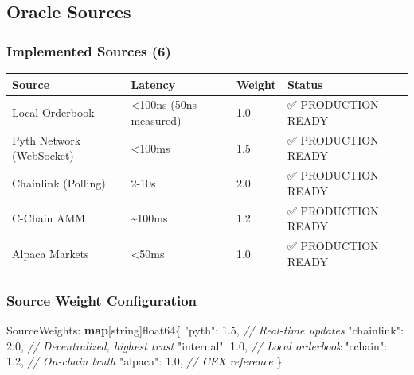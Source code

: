 \documentclass[
]{article}
\newenvironment{Shaded}{}{}
\newcommand{\CommentTok}[1]{\textcolor[rgb]{0.38,0.63,0.69}{\textit{#1}}}
\newcommand{\DataTypeTok}[1]{\textcolor[rgb]{0.56,0.13,0.00}{#1}}
\newcommand{\FloatTok}[1]{\textcolor[rgb]{0.25,0.63,0.44}{#1}}
\newcommand{\KeywordTok}[1]{\textcolor[rgb]{0.00,0.44,0.13}{\textbf{#1}}}
\newcommand{\NormalTok}[1]{#1}
\newcommand{\OperatorTok}[1]{\textcolor[rgb]{0.40,0.40,0.40}{#1}}
\newcommand{\StringTok}[1]{\textcolor[rgb]{0.25,0.44,0.63}{#1}}
\newcounter{none} %
\begin{document}
\subsection{Oracle Sources}\label{oracle-sources}

\subsubsection{Implemented Sources (6)}\label{implemented-sources-6}

{\def\LTcaptype{none} %
\begin{longtable}[]{@{}llll@{}}
\toprule\noalign{}
Source & Latency & Weight & Status \\
\midrule\noalign{}
\endhead
\bottomrule\noalign{}
\endlastfoot
Local Orderbook & \textless100ns (50ns measured) & 1.0 & ✅ PRODUCTION
READY \\
Pyth Network (WebSocket) & \textless100ms & 1.5 & ✅ PRODUCTION READY \\
Chainlink (Polling) & 2-10s & 2.0 & ✅ PRODUCTION READY \\
C-Chain AMM & \textasciitilde100ms & 1.2 & ✅ PRODUCTION READY \\
Alpaca Markets & \textless50ms & 1.0 & ✅ PRODUCTION READY \\
\end{longtable}
}

\subsubsection{Source Weight
Configuration}\label{source-weight-configuration}

\begin{Shaded}
\begin{Highlighting}[]
\NormalTok{SourceWeights}\OperatorTok{:} \KeywordTok{map}\OperatorTok{[}\DataTypeTok{string}\OperatorTok{]}\DataTypeTok{float64}\OperatorTok{\{}
    \StringTok{"pyth"}\OperatorTok{:}      \FloatTok{1.5}\OperatorTok{,}  \CommentTok{// Real{-}time updates}
    \StringTok{"chainlink"}\OperatorTok{:} \FloatTok{2.0}\OperatorTok{,}  \CommentTok{// Decentralized, highest trust}
    \StringTok{"internal"}\OperatorTok{:}  \FloatTok{1.0}\OperatorTok{,}  \CommentTok{// Local orderbook}
    \StringTok{"cchain"}\OperatorTok{:}    \FloatTok{1.2}\OperatorTok{,}  \CommentTok{// On{-}chain truth}
    \StringTok{"alpaca"}\OperatorTok{:}    \FloatTok{1.0}\OperatorTok{,}  \CommentTok{// CEX reference}
\OperatorTok{\}}
\end{Highlighting}
\end{Shaded}
\end{document}
